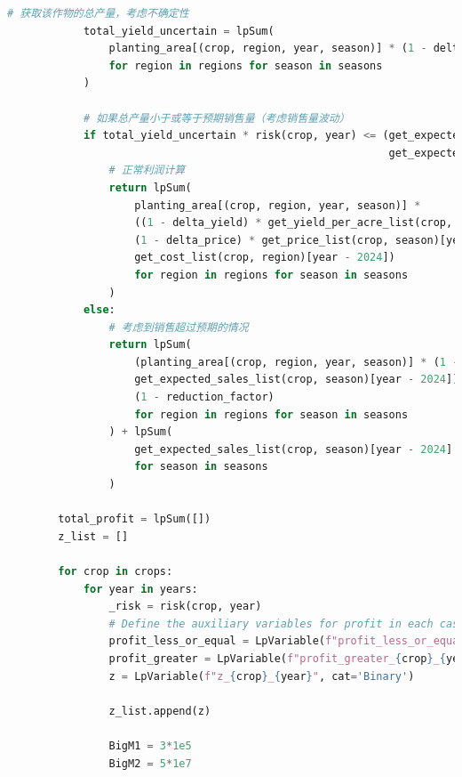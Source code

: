 \documentclass{cumcmthesis}
\begin{document}
\begin{appendices}
\begin{lstlisting}[language=python]
            # 获取该作物的总产量，考虑不确定性
            total_yield_uncertain = lpSum(
                planting_area[(crop, region, year, season)] * (1 - delta_yield) * get_yield_per_acre_list(crop, region)[year - 2024]
                for region in regions for season in seasons
            )
    
            # 如果总产量小于或等于预期销售量（考虑销售量波动）
            if total_yield_uncertain * risk(crop, year) <= (get_expected_sales_list(crop, '第一季')[year - 2024] * (1 - delta_sales) +
                                                            get_expected_sales_list(crop, '第二季')[year - 2024] * (1 - delta_sales)):
                # 正常利润计算
                return lpSum(
                    planting_area[(crop, region, year, season)] *
                    ((1 - delta_yield) * get_yield_per_acre_list(crop, region)[year - 2024] * 
                    (1 - delta_price) * get_price_list(crop, season)[year - 2024] * risk(crop, year) -
                    get_cost_list(crop, region)[year - 2024])
                    for region in regions for season in seasons
                )
            else:
                # 考虑到销售超过预期的情况
                return lpSum(
                    (planting_area[(crop, region, year, season)] * (1 - delta_yield) * get_yield_per_acre_list(crop, region)[year - 2024] -
                    get_expected_sales_list(crop, season)[year - 2024]) * (1 - delta_price) * get_price_list(crop, season)[year - 2024] *
                    (1 - reduction_factor)
                    for region in regions for season in seasons
                ) + lpSum(
                    get_expected_sales_list(crop, season)[year - 2024] * (1 - delta_price) * get_price_list(crop, season)[year - 2024]
                    for season in seasons
                )
    
        total_profit = lpSum([])
        z_list = []
    
        for crop in crops:
            for year in years:
                _risk = risk(crop, year)
                # Define the auxiliary variables for profit in each case
                profit_less_or_equal = LpVariable(f"profit_less_or_equal_{crop}_{year}", lowBound=0)
                profit_greater = LpVariable(f"profit_greater_{crop}_{year}", lowBound=0)
                z = LpVariable(f"z_{crop}_{year}", cat='Binary')
    
                z_list.append(z)
    
                BigM1 = 3*1e5
                BigM2 = 5*1e7
    

\end{lstlisting}
\end{appendices}
\end{document}
